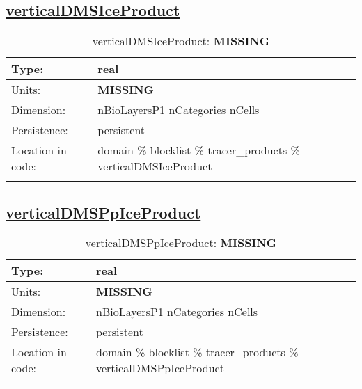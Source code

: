 \subsection[verticalDMSIceProduct]{\hyperref[sec:var_tab_tracer_products]{verticalDMSIceProduct}}
\label{subsec:var_sec_tracer_products_verticalDMSIceProduct}
\begin{center}
\begin{longtable}{| p{2.0in} | p{4.0in} |}
        \hline 
        Type: & real \\
        \hline 
        Units: & {\bf \color{red} MISSING} \\
        \hline 
        Dimension: & nBioLayersP1 nCategories nCells \\
        \hline 
        Persistence: & persistent \\
        \hline 
         Location in code: & domain \% blocklist \% tracer\_products \% verticalDMSIceProduct \\
         \hline 
    \caption{verticalDMSIceProduct: {\bf \color{red} MISSING}}
\end{longtable}
\end{center}
\subsection[verticalDMSPpIceProduct]{\hyperref[sec:var_tab_tracer_products]{verticalDMSPpIceProduct}}
\label{subsec:var_sec_tracer_products_verticalDMSPpIceProduct}
\begin{center}
\begin{longtable}{| p{2.0in} | p{4.0in} |}
        \hline 
        Type: & real \\
        \hline 
        Units: & {\bf \color{red} MISSING} \\
        \hline 
        Dimension: & nBioLayersP1 nCategories nCells \\
        \hline 
        Persistence: & persistent \\
        \hline 
         Location in code: & domain \% blocklist \% tracer\_products \% verticalDMSPpIceProduct \\
         \hline 
    \caption{verticalDMSPpIceProduct: {\bf \color{red} MISSING}}
\end{longtable}
\end{center}
